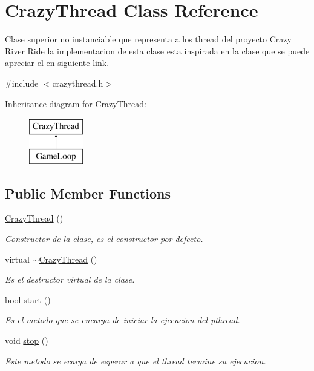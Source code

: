 \hypertarget{class_crazy_thread}{\section{Crazy\-Thread Class Reference}
\label{class_crazy_thread}
}


Clase superior no instanciable que representa a los thread del proyecto Crazy River Ride la implementacion de esta clase esta inspirada en la clase que se puede apreciar el en siguiente link.  




{\ttfamily \#include $<$crazythread.\-h$>$}

Inheritance diagram for Crazy\-Thread\-:\begin{figure}[H]
\begin{center}
\leavevmode
\includegraphics[height=2.000000cm]{class_crazy_thread}
\end{center}
\end{figure}
\subsection*{Public Member Functions}
\begin{DoxyCompactItemize}
\item 
\hyperlink{class_crazy_thread_a0e0ca1644ff99dc033d11a58e0e54cd8}{Crazy\-Thread} ()
\begin{DoxyCompactList}\small\item\em Constructor de la clase, es el constructor por defecto. \end{DoxyCompactList}\item 
virtual \hyperlink{class_crazy_thread_a46e62f5a5f328d329b5b14edc693fd77}{$\sim$\-Crazy\-Thread} ()
\begin{DoxyCompactList}\small\item\em Es el destructor virtual de la clase. \end{DoxyCompactList}\item 
bool \hyperlink{class_crazy_thread_a2f355e56337c7f4b3f627633f51f9388}{start} ()
\begin{DoxyCompactList}\small\item\em Es el metodo que se encarga de iniciar la ejecucion del pthread. \end{DoxyCompactList}\item 
void \hyperlink{class_crazy_thread_acd83eb404d4edc6db97f307aead10a32}{stop} ()
\begin{DoxyCompactList}\small\item\em Este metodo se ecarga de esperar a que el thread termine su ejecucion. \end{DoxyCompactList}\end{DoxyCompactItemize}
